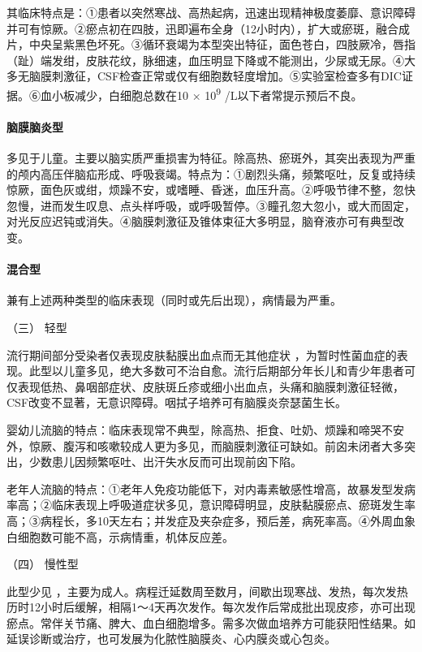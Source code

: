 其临床特点是：①患者以突然寒战、高热起病，迅速出现精神极度萎靡、意识障碍并可有惊厥。②瘀点初在四肢，迅即遍布全身（12小时内），扩大或瘀斑，融合成片，中央呈紫黑色坏死。③循环衰竭为本型突出特征，面色苍白，四肢厥冷，唇指（趾）端发绀，皮肤花纹，脉细速，血压明显下降或不能测出，少尿或无尿。④大多无脑膜刺激征，CSF检查正常或仅有细胞数轻度增加。⑤实验室检查多有DIC证据。⑥血小板减少，白细胞总数在10
× 10\textsuperscript{9} /L以下者常提示预后不良。

\paragraph{脑膜脑炎型}

多见于儿童。主要以脑实质严重损害为特征。除高热、瘀斑外，其突出表现为严重的颅内高压伴脑疝形成、呼吸衰竭。特点为：①剧烈头痛，频繁呕吐，反复或持续惊厥，面色灰或绀，烦躁不安，或嗜睡、昏迷，血压升高。②呼吸节律不整，忽快忽慢，进而发生叹息、点头样呼吸，或呼吸暂停。③瞳孔忽大忽小，或大而固定，对光反应迟钝或消失。④脑膜刺激征及锥体束征大多明显，脑脊液亦可有典型改变。

\paragraph{混合型}

兼有上述两种类型的临床表现（同时或先后出现），病情最为严重。

\hypertarget{text00231.htmlux5cux23CHP7-11-2-2-3}{}
（三） 轻型

流行期间部分受染者仅表现皮肤黏膜出血点而无其他症状
，为暂时性菌血症的表现。此型以儿童多见，绝大多数可不治自愈。流行后期部分年长儿和青少年患者可仅表现低热、鼻咽部症状、皮肤斑丘疹或细小出血点，头痛和脑膜刺激征轻微，CSF改变不显著，无意识障碍。咽拭子培养可有脑膜炎奈瑟菌生长。

婴幼儿流脑的特点：临床表现常不典型，除高热、拒食、吐奶、烦躁和啼哭不安外，惊厥、腹泻和咳嗽较成人更为多见，而脑膜刺激征可缺如。前囟未闭者大多突出，少数患儿因频繁呕吐、出汗失水反而可出现前囟下陷。

老年人流脑的特点：①老年人免疫功能低下，对内毒素敏感性增高，故暴发型发病率高；②临床表现上呼吸道症状多见，意识障碍明显，皮肤黏膜瘀点、瘀斑发生率高；③病程长，多10天左右；并发症及夹杂症多，预后差，病死率高。④外周血象白细胞数可能不高，示病情重，机体反应差。

\hypertarget{text00231.htmlux5cux23CHP7-11-2-2-4}{}
（四） 慢性型

此型少见
，主要为成人。病程迁延数周至数月，间歇出现寒战、发热，每次发热历时12小时后缓解，相隔1～4天再次发作。每次发作后常成批出现皮疹，亦可出现瘀点。常伴关节痛、脾大、血白细胞增多。需多次做血培养方可能获阳性结果。如延误诊断或治疗，也可发展为化脓性脑膜炎、心内膜炎或心包炎。

